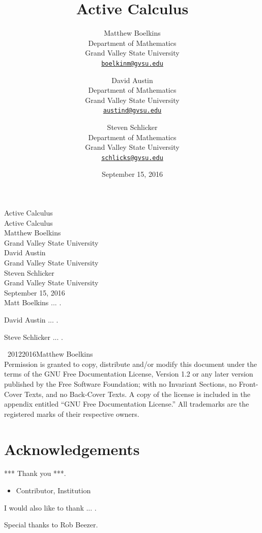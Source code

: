 \documentclass[10pt,]{book}
\title{Active Calculus }
\author{Matthew Boelkins\\
Department of Mathematics\\
Grand Valley State University\\
\href{mailto:boelkinm@gvsu.edu}{\nolinkurl{boelkinm@gvsu.edu}}
\and
David Austin\\
Department of Mathematics\\
Grand Valley State University\\
\href{mailto:austind@gvsu.edu}{\nolinkurl{austind@gvsu.edu}}
\and
Steven Schlicker\\
Department of Mathematics\\
Grand Valley State University\\
\href{mailto:schlicks@gvsu.edu}{\nolinkurl{schlicks@gvsu.edu}}
}
\date{September 15, 2016}
\theoremstyle{plain}
\theoremstyle{definition}
\theoremstyle{definition}
\theoremstyle{definition}
\theoremstyle{definition}
\theoremstyle{definition}
\numberwithin{equation}{section}
\begin{document}
\frontmatter
\thispagestyle{empty}
{\centering
\vspace*{0.28\textheight}
{\Huge Active Calculus }\\}
\clearpage
\thispagestyle{empty}
\null%
\clearpage
\thispagestyle{empty}
{\centering
\vspace*{0.14\textheight}
{\Huge Active Calculus }\\[3\baselineskip]
{\Large Matthew Boelkins}\\[0.5\baselineskip]
{\Large Grand Valley State University}\\[3\baselineskip]
{\Large David Austin}\\[0.5\baselineskip]
{\Large Grand Valley State University}\\[3\baselineskip]
{\Large Steven Schlicker}\\[0.5\baselineskip]
{\Large Grand Valley State University}\\[3\baselineskip]
{\Large September 15, 2016}\\}
\clearpage
\thispagestyle{empty}
\noindent
Matt Boelkins ... .%
\par
David Austin ... .%
\par
Steve Schlicker ... .%
\par
{}
\noindent\textcopyright\ 2012\textendash{}2016\quad{}Matthew Boelkins\\[0.5\baselineskip]
Permission is granted to copy, distribute and/or modify this document under the terms of the GNU Free Documentation License, Version 1.2 or any later version published by the Free Software Foundation; with no Invariant Sections, no Front-Cover Texts, and no Back-Cover Texts.  A copy of the license is included in the appendix entitled ``GNU Free Documentation License.''  All trademarks\texttrademark{} are the registered\textregistered{} marks of their respective owners.\par\medskip
{}
\null\clearpage
\chapter*{Acknowledgements}\label{acknowledgement-1}
*** Thank you ***. %
\leavevmode%
\begin{itemize}[label=\textbullet]
\item{}Contributor, Institution%
\end{itemize}
\par
I would also like to thank ... .%
\par
Special thanks to Rob Beezer.%
\end{document}
